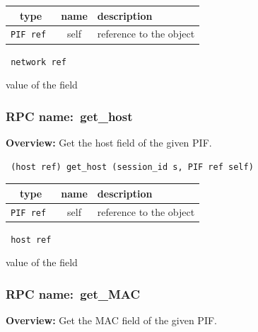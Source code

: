  
\vspace{0.3cm}
\begin{tabular}{|c|c|p{7cm}|}
 \hline
{\bf type} & {\bf name} & {\bf description} \\ \hline
{\tt PIF ref } & self & reference to the object \\ \hline 

\end{tabular}

\vspace{0.3cm}

{\tt 
network ref
}


value of the field
\vspace{0.3cm}
\vspace{0.3cm}
\vspace{0.3cm}
\subsubsection{RPC name:~get\_host}

{\bf Overview:} 
Get the host field of the given PIF.

\begin{verbatim} (host ref) get_host (session_id s, PIF ref self)\end{verbatim}



 
\vspace{0.3cm}
\begin{tabular}{|c|c|p{7cm}|}
 \hline
{\bf type} & {\bf name} & {\bf description} \\ \hline
{\tt PIF ref } & self & reference to the object \\ \hline 

\end{tabular}

\vspace{0.3cm}

{\tt 
host ref
}


value of the field
\vspace{0.3cm}
\vspace{0.3cm}
\vspace{0.3cm}
\subsubsection{RPC name:~get\_MAC}

{\bf Overview:} 
Get the MAC field of the given PIF.

